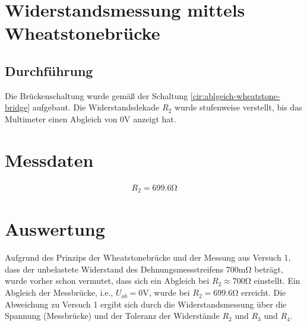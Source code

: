 \section[Widerstandsmessung]{Widerstandsmessung mittels Wheatstonebrücke}
\subsection{Durchführung}

Die Brückenschaltung wurde gemäß der Schaltung \ref{cir:ablgeich-wheatstone-bridge} aufgebaut.
Die Widerstandsdekade \( R_2 \) wurde stufenweise verstellt,
bis das Multimeter einen Abgleich von \( 0\si{\volt} \) anzeigt hat.

\section{Messdaten}

\begin{align}
    R_2 = 699.6 \si{\ohm}
\end{align}

\section{Auswertung}

Aufgrund des Prinzips der Wheatstonebrücke und der Messung aus Versuch 1,
dass der unbelastete Widerstand des Dehnungsmessstreifens \( 700 \si{\milli\ohm } \) beträgt,
wurde vorher schon vermutet,
dass sich ein Abgleich bei \( R_2 \approx 700 \si{\ohm} \) einstellt.
Ein Abgleich der Messbrücke, i.e., \( U_{ab} = 0 \si{\volt} \),
wurde bei \( R_2 = 699.6 \si{\ohm} \) erreicht.
Die Abweichung zu Versuch 1 ergibt sich durch die Widerstandsmessung
über die Spannung (Messbrücke) und der Toleranz der Widerstände \( R_2 \) und \( R_3 \) und \( R_4 \).